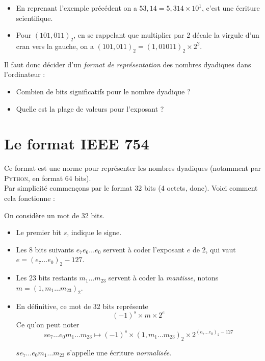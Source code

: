 \begin{exemple}
    \begin{itemize}
        \item   En reprenant l'exemple précédent on a $53,14=5,314\times 10^1$, c'est une écriture scientifique.
        \item   Pour $(101,011)_2$, en se rappelant que multiplier par 2 décale la virgule d'un cran vers la gauche, on a $(101,011)_2=(1,01011)_2\times
                  2^2$.
    \end{itemize}
\end{exemple}

Il faut donc décider d'un \textit{format de représentation} des nombres dyadiques dans l'ordinateur :
\begin{itemize}
    \item   Combien de bits significatifs pour le nombre dyadique ?
    \item   Quelle est la plage de valeurs pour l'exposant ?
\end{itemize}
\section{Le format IEEE 754}

Ce format est une norme pour représenter les nombres dyadiques (notamment par \textsc{Python}, en format 64 bits).\\
Par simplicité commençons par le format 32 bits (4 octets, donc).
Voici comment cela fonctionne :

\begin{definition}
    On considère un mot de 32 bits.
    \begin{itemize}
        \item Le premier bit $s$, indique le signe.
        \item Les 8 bits suivants  $e_7e_6\ldots e_0$ servent à coder l'exposant $e$ de 2, qui vaut $e=(e_7\ldots e_0)_2-127$.
        \item Les 23 bits restants $m_1\ldots m_{23}$ servent à coder la \textit{mantisse}, notons $m=(1,m_1\ldots m_{23})_2$.
        \item En définitive, ce mot de 32 bits représente $$\boxed{(-1)^s\times m\times 2^e}$$
              Ce qu'on peut noter
              $$se_7\ldots e_0m_1\ldots m_{23}\mapsto (-1)^s\times(1,m_1\ldots m_{23})_2\times 2^{(e_7\ldots e_0)_2-127}$$

              $se_7\ldots e_0m_1\ldots m_{23}$ s'appelle une écriture \textit{normalisée}.
    \end{itemize}
\end{definition}

